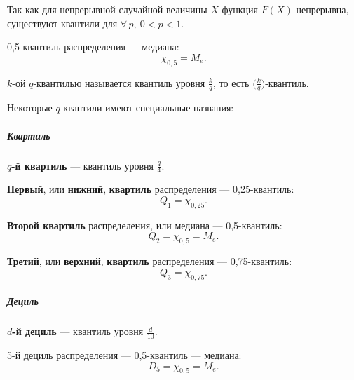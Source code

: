 \documentclass[a4paper]{article}
\newcommand{\key}[1]{{\color{Medium}\bfseries #1}}
\begin{document}
                    Так как для непрерывной случайной величины $X$ функция $F(X)$ непрерывна, существуют квантили для $\forall \, p, \: 0 < p < 1$.

                    0,5-квантиль распределения --- медиана:
                    \begin{equation*}
                        \chi_{0,5} = M_e .
                    \end{equation*}

                    $k$-ой $q$-квантилью называется квантиль уровня $\frac{k}{q}$, то есть $\big( \frac{k}{q} \big)$-квантиль.

                    Некоторые $q$-квантили имеют специальные названия:

                    \subparagraph{Квартиль}

                        \key{\boldmath$q$-й квартиль} --- квантиль уровня $\frac{q}{4}$.

                        \key{Первый}, или \key{нижний}, \key{квартиль} распределения --- 0,25-квантиль:
                        \begin{equation*}
                            Q_1 = \chi_{0,25} .
                        \end{equation*}
                        
                        \key{Второй квартиль} распределения, или медиана --- 0,5-квантиль:
                        \begin{equation*}
                            Q_2 = \chi_{0,5} = M_e .
                        \end{equation*}
                        
                        \key{Третий}, или \key{верхний}, \key{квартиль} распределения --- 0,75-квантиль:
                        \begin{equation*}
                            Q_3 = \chi_{0,75} .
                        \end{equation*}

                    \subparagraph{Дециль}

                        \key{\boldmath$d$-й дециль} --- квантиль уровня $\frac{d}{10}$.

                        5-й дециль распределения --- 0,5-квантиль --- медиана:
                        \begin{equation*}
                            D_5 = \chi_{0,5} = M_e .
                        \end{equation*}
                
\end{document}
